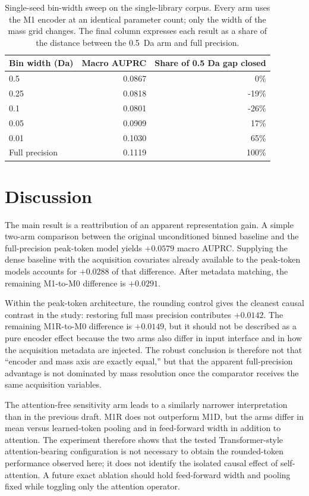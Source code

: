 \documentclass[11pt]{article}
\begin{document}
\begin{table}[ht]
\centering
\caption{Single-seed bin-width sweep on the single-library corpus. Every arm uses the M1 encoder at an identical parameter count; only the width of the mass grid changes. The final column expresses each result as a share of the distance between the 0.5~Da arm and full precision.}
\label{tab:sweep}
\small
\begin{tabular}{lrr}
\toprule
Bin width (Da) & Macro AUPRC & Share of 0.5 Da gap closed\\
\midrule
0.5 & 0.0867 & 0\%\\
0.25 & 0.0818 & -19\%\\
0.1 & 0.0801 & -26\%\\
0.05 & 0.0909 & 17\%\\
0.01 & 0.1030 & 65\%\\
Full precision & 0.1119 & 100\%\\
\bottomrule
\end{tabular}
\end{table}

\section*{Discussion}
The main result is a reattribution of an apparent representation gain. A simple two-arm comparison between the original unconditioned binned baseline and the full-precision peak-token model yields $+0.0579$ macro AUPRC. Supplying the dense baseline with the acquisition covariates already available to the peak-token models accounts for $+0.0288$ of that difference. After metadata matching, the remaining M1-to-M0 difference is $+0.0291$.

Within the peak-token architecture, the rounding control gives the cleanest causal contrast in the study: restoring full mass precision contributes $+0.0142$. The remaining M1R-to-M0 difference is $+0.0149$, but it should not be described as a pure encoder effect because the two arms also differ in input interface and in how the acquisition metadata are injected. The robust conclusion is therefore not that ``encoder and mass axis are exactly equal,'' but that the apparent full-precision advantage is not dominated by mass resolution once the comparator receives the same acquisition variables.

The attention-free sensitivity arm leads to a similarly narrower interpretation than in the previous draft. M1R does not outperform M1D, but the arms differ in mean versus learned-token pooling and in feed-forward width in addition to attention. The experiment therefore shows that the tested Transformer-style attention-bearing configuration is not necessary to obtain the rounded-token performance observed here; it does not identify the isolated causal effect of self-attention. A future exact ablation should hold feed-forward width and pooling fixed while toggling only the attention operator.
\end{document}
